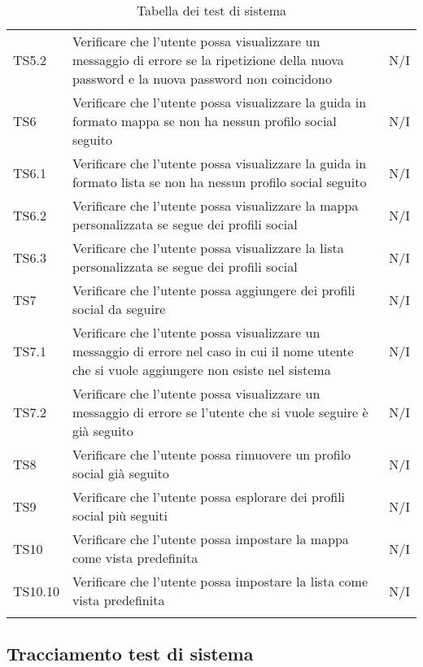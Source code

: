 {\begin{longtable}{C{.3\freewidth} C{.5\freewidth} C{.3\freewidth}}
    TS5.2 & Verificare che l'utente possa visualizzare un messaggio di errore se la ripetizione della nuova password e la nuova password non coincidono & N/I  \\
    TS6 & Verificare che l'utente possa visualizzare la guida in formato mappa se non ha nessun profilo social seguito & N/I  \\
    TS6.1 & Verificare che l'utente possa visualizzare la guida in formato lista se non ha nessun profilo social seguito & N/I  \\
    TS6.2 & Verificare che l'utente possa visualizzare la mappa personalizzata se segue dei profili social & N/I  \\
    TS6.3 & Verificare che l'utente possa visualizzare la lista personalizzata se segue dei profili social & N/I  \\
    TS7 & Verificare che l'utente possa aggiungere dei profili social da seguire & N/I  \\
    TS7.1 & Verificare che l'utente possa visualizzare un messaggio di errore nel caso in cui il nome utente che si vuole aggiungere non esiste nel sistema & N/I  \\
    TS7.2 & Verificare che l'utente possa visualizzare un messaggio di errore se l'utente che si vuole seguire è già seguito & N/I  \\
    TS8 & Verificare che l'utente possa rimuovere un profilo social già seguito & N/I  \\
    TS9 & Verificare che l'utente possa esplorare dei profili social più seguiti & N/I  \\
    TS10 & Verificare che l'utente possa impostare  la mappa come vista predefinita & N/I  \\
    TS10.10 & Verificare che l'utente possa impostare  la lista come vista predefinita & N/I  \\
    \bottomrule
    \caption{Tabella dei test di sistema}
\end{longtable}
    
}
\subsection{Tracciamento test di sistema}

